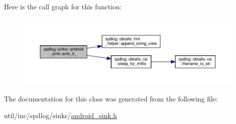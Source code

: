 Here is the call graph for this function\+:
\nopagebreak
\begin{figure}[H]
\begin{center}
\leavevmode
\includegraphics[width=350pt]{classspdlog_1_1sinks_1_1android__sink_ab91c7aabd013d009ff811e6d34324128_cgraph}
\end{center}
\end{figure}


The documentation for this class was generated from the following file\+:\begin{DoxyCompactItemize}
\item 
util/inc/spdlog/sinks/\hyperlink{android__sink_8h}{android\+\_\+sink.\+h}\end{DoxyCompactItemize}
